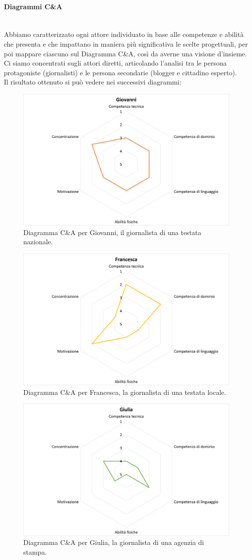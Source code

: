 \paragraph{Diagrammi C\&A}\mbox{}\\
Abbiamo caratterizzato ogni attore individuato in base alle competenze e abilità che presenta e che impattano in maniera più significativa le scelte progettuali, per poi mappare ciascuno sul Diagramma C\&A, così da averne una visione d'insieme.
Ci siamo concentrati sugli attori diretti, articolando l'analisi tra le persona protagoniste (giornalisti) e le persona secondarie (blogger e cittadino esperto).\\
Il risultato ottenuto si può vedere nei successivi diagrammi:
\begin{figure}[!h]
    \centering
    \includegraphics[width=0.5\columnwidth]{assets/images/proposta-design/caos/giovanni}
    \caption{Diagramma C\&A per Giovanni, il giornalista di una testata nazionale.}
\end{figure}

\begin{figure}[!h]
    \centering
    \includegraphics[width=0.5\columnwidth]{assets/images/proposta-design/caos/francesca}
    \caption{Diagramma C\&A per Francesca, la giornalista di una testata locale.}
\end{figure}

\begin{figure}[!h]
    \centering
    \includegraphics[width=0.5\columnwidth]{assets/images/proposta-design/caos/giulia}
    \caption{Diagramma C\&A per Giulia, la giornalista di una agenzia di stampa.}
\end{figure}

